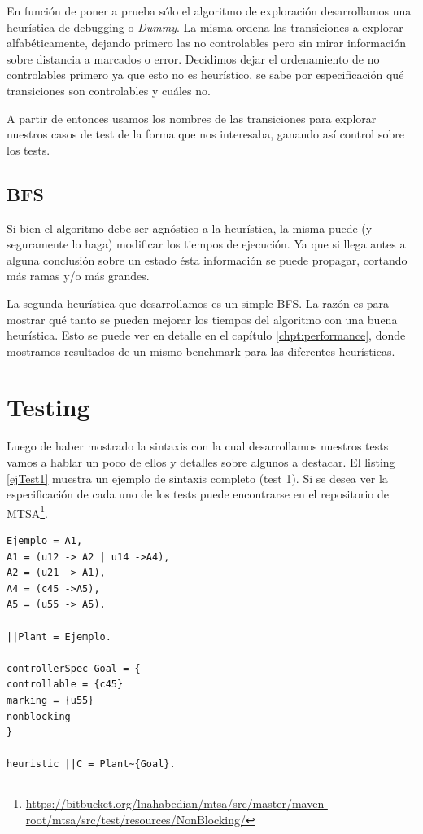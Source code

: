 En función de poner a prueba sólo el algoritmo de exploración desarrollamos una heurística de debugging o \textit{Dummy}. La misma ordena las transiciones a explorar alfabéticamente, dejando primero las no controlables pero sin mirar información sobre distancia a marcados o error. Decidimos dejar el ordenamiento de no controlables primero ya que esto no es heurístico, se sabe por especificación qué transiciones son controlables y cuáles no.

A partir de entonces usamos los nombres de las transiciones para explorar nuestros casos de test de la forma que nos interesaba, ganando así control sobre los tests.

\subsection{BFS}
Si bien el algoritmo debe ser agnóstico a la heurística, la misma puede (y seguramente lo haga) modificar los tiempos de ejecución. Ya que si llega antes a alguna conclusión sobre un estado ésta información se puede propagar, cortando más ramas y/o más grandes.

La segunda heurística que desarrollamos es un simple BFS. La razón es para mostrar qué tanto se pueden mejorar los tiempos del algoritmo con una buena heurística. Esto se puede ver en detalle en el capítulo \ref{chpt:performance}, donde mostramos resultados de un mismo benchmark para las diferentes heurísticas.

\section{Testing}
Luego de haber mostrado la sintaxis con la cual desarrollamos nuestros tests vamos a hablar un poco de ellos y detalles sobre algunos a destacar. El listing \ref{ejTest1} muestra un ejemplo de sintaxis completo (test 1). Si se desea ver la especificación de cada uno de los tests puede encontrarse en el repositorio de MTSA\footnote{\href{https://bitbucket.org/lnahabedian/mtsa/src/master/maven-root/mtsa/src/test/resources/NonBlocking/}{https://bitbucket.org/lnahabedian/mtsa/src/master/maven-root/mtsa/src/test/resources/NonBlocking/}}.

\begin{lstlisting}[language = mtsa, caption=Test 1 a modo de ejemplo, label=ejTest1] 
Ejemplo = A1,
A1 = (u12 -> A2 | u14 ->A4),
A2 = (u21 -> A1),
A4 = (c45 ->A5),
A5 = (u55 -> A5).

||Plant = Ejemplo.

controllerSpec Goal = {
controllable = {c45}
marking = {u55}
nonblocking
}

heuristic ||C = Plant~{Goal}.
\end{lstlisting}

